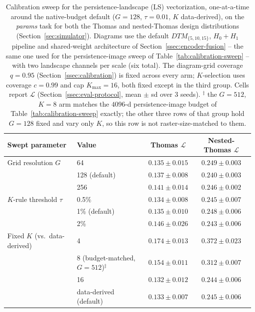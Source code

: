 \documentclass[11pt,letterpaper]{article}
\newcommand{\1}{\mathds{1}}
\theoremstyle{plain}
\theoremstyle{definitioncolon}
\begin{document}
\begin{table}[tbp]
\centering
\small
\begin{tabular}{llcc}
\toprule
Swept parameter & Value & Thomas $\mathcal{L}$ & Nested-Thomas $\mathcal{L}$ \\
\midrule
Grid resolution $G$
  & 64             & $0.135 \pm 0.015$ & $0.249 \pm 0.003$ \\
  & 128 (default)  & $0.137 \pm 0.008$ & $0.240 \pm 0.003$ \\
  & 256            & $0.141 \pm 0.014$ & $0.246 \pm 0.002$ \\
\addlinespace
$K$-rule threshold $\tau$
  & 0.5\%            & $0.134 \pm 0.008$ & $0.245 \pm 0.007$ \\
  & 1\% (default)    & $0.135 \pm 0.010$ & $0.248 \pm 0.006$ \\
  & 2\%              & $0.146 \pm 0.026$ & $0.243 \pm 0.006$ \\
\addlinespace
Fixed $K$ (vs.\ data-derived)
  & 4                                  & $0.174 \pm 0.013$ & $0.372 \pm 0.023$ \\
  & 8 (budget-matched, $G=512$)$^\ddagger$ & $0.154 \pm 0.011$ & $0.312 \pm 0.007$ \\
  & 16                                 & $0.132 \pm 0.012$ & $0.244 \pm 0.006$ \\
  & data-derived (default)             & $0.133 \pm 0.007$ & $0.245 \pm 0.006$ \\
\bottomrule
\end{tabular}
\caption{Calibration sweep for the persistence-landscape (LS) vectorization,
one-at-a-time around the native-budget default ($G=128$, $\tau=0.01$, $K$
data-derived), on the \emph{params} task for both the Thomas and nested-Thomas
design distributions (Section~\ref{sec:simulator}). Diagrams use the default
$DTM_{\{5,10,15\}}$, $H_0{+}H_1$ pipeline and shared-weight architecture of
Section~\ref{ssec:encoder-fusion} -- the same one used for the
persistence-image sweep of Table~\ref{tab:calibration-sweep} -- with two
landscape channels per scale (six total). The diagram-grid coverage $q =
0.95$ (Section~\ref{ssec:calibration}) is fixed across every arm;
$K$-selection uses coverage $c=0.99$ and cap $K_{\max}=16$, both fixed except
in the third group. Cells report $\mathcal{L}$
(Section~\ref{ssec:eval-protocol}, mean $\pm$ sd over 3 seeds). $^\ddagger$
the $G=512$, $K=8$ arm matches the $4096$-d persistence-image budget of
Table~\ref{tab:calibration-sweep} exactly; the other three rows of that group
hold $G=128$ fixed and vary only $K$, so this row is not raster-size-matched
to them.}
\label{tab:calibration-sweep-landscape}
\end{table}
\end{document}
